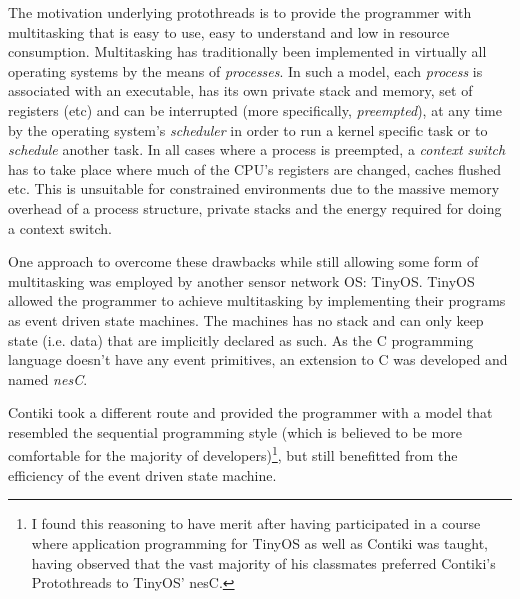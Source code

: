 \documentclass[final,a4paper,twoside,11pt,onecolumn]{report}
\begin{document}
The motivation underlying protothreads is to provide the programmer with multitasking that is easy to use, easy to understand and low in resource consumption. Multitasking has traditionally been implemented in virtually all operating systems by the means of \emph{processes}. In such a model, each \emph{process} is associated with an executable, has its own private stack and memory, set of registers (etc) and can be interrupted (more specifically, \emph{preempted}), at any time by the operating system's \emph{scheduler} in order to run a kernel specific task or to \emph{schedule} another task. In all cases where a process is preempted, a \emph{context switch} has to take place where much of the CPU's registers are changed, caches flushed etc. This is unsuitable for constrained environments due to the massive memory overhead of a process structure, private stacks and the energy required for doing a context switch.

One approach to overcome these drawbacks while still allowing some form of multitasking was employed by another sensor network OS: TinyOS\cite{levis2005tinyos}. TinyOS allowed the programmer to achieve multitasking by implementing their programs as event driven state machines. The machines has no stack and can only keep state (i.e. data) that are implicitly declared as such. As the C programming language doesn't have any event primitives, an extension to C was developed and named \emph{nesC}\cite{gay2003nesc}.

Contiki took a different route and provided the programmer with a model that resembled the sequential programming style (which is believed to be more comfortable for the majority of developers)\footnote{I found this reasoning to have merit after having participated in a course where application programming for TinyOS as well as Contiki was taught, having observed that the vast majority of his classmates preferred Contiki's Protothreads to TinyOS' nesC.}, but still benefitted from the efficiency of the event driven state machine.
\end{document}
